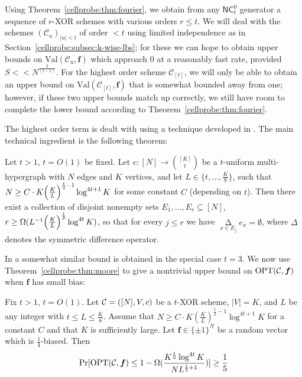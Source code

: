 Using Theorem~\ref{cellprobe:thm:fourier}, we obtain from any $\mathsf{NC}^0_t$ generator a sequence of $r$-XOR schemes with various orders $r \leq t$. We will deal with the schemes $(\mathcal{C}_u)_{ |u|<t}$ of order $<t$ using limited independence as in Section~\ref{cellprobe:subsec:k-wise-lbs}; for these we can hope to obtain upper bounds on $\mathrm{Val}(\mathcal{C}_u,\bm{f})$ which approach 0 at a reasonably fast rate, provided $S << N^{\frac{2}{(t-1)}}$. For the highest order scheme $\mathcal{C}_{[t]}$, we will only be able to obtain an upper bound on $\mathrm{Val}(\mathcal{C}_{[t]},\bm{f})$ that is somewhat bounded away from one; however, if these two upper bounds match up correctly, we still have room to complete the lower bound according to Theorem~\ref{cellprobe:thm:fourier}.

The highest order term is dealt with using a technique developed in \cite{FKO,smoothed}. The main technical ingredient is the following theorem:
\begin{theorem}\label{cellprobe:thm:moore}
Let $t > 1$, $t = O(1)$ be fixed. Let $e: [N] \to \binom{[K]}{t}$ be a $t$-uniform multi-hypergraph with $N$ edges and $K$ vertices, and let $L \in \{t,\ldots, \frac{K}{8}\}$, such that $N \geq C \cdot  K \Bigl(\frac{K}{L}\Bigr)^{\frac{t}{2}-1} \log^{4t + 1} K$ for some constant $C$ (depending on $t$). Then there exist a collection of disjoint nonempty sets $E_1,\ldots, E_r \subseteq [N]$, $r \geq \Omega(L^{-1} \Bigl(\frac{K}{L}\Bigr)^{\frac{t}{2}} \log^{4t} K)$, so that for every $j \leq r$ we have $\mathop{\Delta}\limits_{x \in E_j} e_x = \emptyset$, where $\Delta$ denotes the symmetric difference operator.
\end{theorem}
In \cite{FKO} a somewhat similar bound is obtained in the special case $t=3$.
We now use Theorem~\ref{cellprobe:thm:moore} to give a nontrivial upper bound on $\mathrm{OPT}(\mathcal{C},\bm{f})$ when $\bm{f}$ has small bias:
\begin{theorem}\label{cellprobe:thm:biased-val}
Fix $t > 1$, $t = O(1)$. Let $\mathcal{C} = ([N],V,c)$ be a $t$-XOR scheme, $|V|=K$, and $L$ be any integer with $t \leq L \leq \frac{K}{8}$. Assume that $N \geq C \cdot   K (\frac{K}{L})^{\frac{t}{2} - 1} \log^{4t +1} K$ for a constant $C$ and that $K$ is sufficiently large. Let $\bm{f}\in  \{\pm 1\}^N$ be a random vector which is $\frac{1}{4}$-biased. Then
\[
\Pr[ \mathrm{OPT}(\mathcal{C},\bm{f}) \leq 1-\Omega(\frac{K^{\frac{t}{2}}\log^{4t}K}{N L^{\frac{t}{2}+1}})] \geq \frac{1}{5}
\]

\end{theorem}
